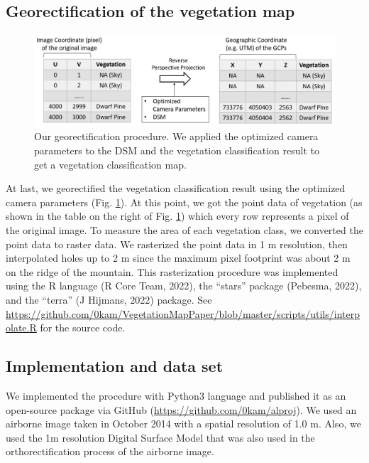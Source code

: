 \documentclass{article}
\begin{document}
\hypertarget{georectification-of-the-vegetation-map}{%
\subsection{Georectification of the vegetation map}\label{georectification-of-the-vegetation-map}}



\begin{figure}
\includegraphics[width=1\linewidth]{paper_files/figures/Slide6} \caption{Our georectification procedure. We applied the optimized camera parameters to the DSM and the vegetation classification result to get a vegetation classification map.}\label{fig:georec}
\end{figure}

At last, we georectified the vegetation classification result using the optimized camera parameters (Fig. \ref{fig:georec}). At this point, we got the point data of vegetation (as shown in the table on the right of Fig. \ref{fig:georec}) which every row represents a pixel of the original image. To measure the area of each vegetation class, we converted the point data to raster data. We rasterized the point data in 1 m resolution, then interpolated holes up to 2 m since the maximum pixel footprint was about 2 m on the ridge of the mountain. This rasterization procedure was implemented using the R language (R Core Team, 2022), the ``stars'' package (Pebesma, 2022), and the ``terra'' (J Hijmans, 2022) package. See \url{https://github.com/0kam/VegetationMapPaper/blob/master/scripts/utils/interpolate.R} for the source code.

\hypertarget{implementation-and-data-set}{%
\subsection{Implementation and data set}\label{implementation-and-data-set}}

We implemented the procedure with Python3 language and published it as an open-source package via GitHub (\url{https://github.com/0kam/alproj}). We used an airborne image taken in October 2014 with a spatial resolution of 1.0 m. Also, we used the 1m resolution Digital Surface Model that was also used in the orthorectification process of the airborne image.
\end{document}
